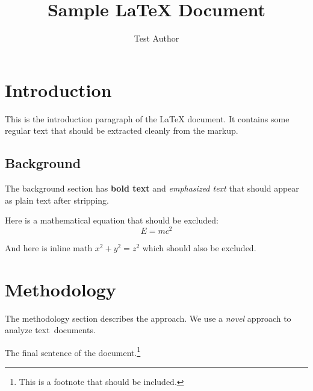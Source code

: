 \documentclass{article}
\title{Sample LaTeX Document}
\author{Test Author}
\begin{document}
\maketitle

\section{Introduction}

This is the introduction paragraph of the LaTeX document. It contains
some regular text that should be extracted cleanly from the markup.

\subsection{Background}

The background section has \textbf{bold text} and \emph{emphasized text}
that should appear as plain text after stripping.

Here is a mathematical equation that should be excluded:
\begin{equation}
E = mc^2
\end{equation}

And here is inline math $x^2 + y^2 = z^2$ which should also be excluded.

\section{Methodology}

The methodology section describes the approach. We use a \textit{novel}
approach to analyze text~documents.

The final sentence of the document.\footnote{This is a footnote that should be included.}
\end{document}
